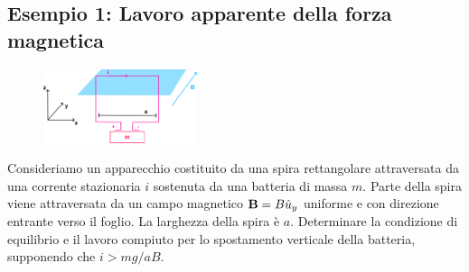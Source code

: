 \subsection{Esempio 1: Lavoro apparente della forza magnetica}
\begin{figure}  %
    \centering
    \includegraphics[width=0.4\textwidth]{images/batteriaplane}  %
\end{figure}
Consideriamo un apparecchio costituito da una spira rettangolare attraversata da una corrente stazionaria $i$ sostenuta da una batteria di massa $m$. Parte della spira viene attraversata da un campo magnetico $\bold{B} = B \hat{u}_{y}$ uniforme e con direzione entrante verso il foglio. La larghezza della spira \`e $a$. Determinare la condizione di equilibrio e il lavoro compiuto per lo spostamento verticale della batteria, supponendo che $i > mg/aB$.
\newline

